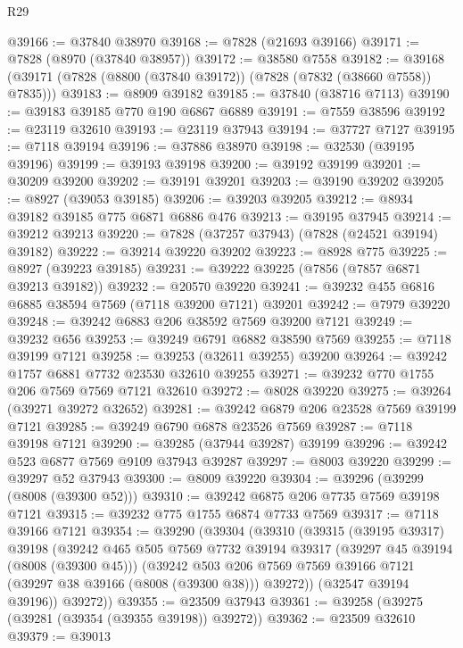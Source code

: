 \begin{lexlean}{R29}
\begin{coremodule}
@39166 := @37840 @38970
@39168 := @7828 (@21693 @39166)
@39171 := @7828 (@8970 (@37840 @38957))
@39172 := @38580 @7558
@39182 := @39168 (@39171 (@7828 (@8800 (@37840 @39172)) (@7828 (@7832 (@38660 @7558)) @7835)))
@39183 := @8909 @39182
@39185 := @37840 (@38716 @7113)
@39190 := @39183 @39185 @770 @190 @6867 @6889
@39191 := @7559 @38596
@39192 := @23119 @32610
@39193 := @23119 @37943
@39194 := @37727 @7127
@39195 := @7118 @39194
@39196 := @37886 @38970
@39198 := @32530 (@39195 @39196)
@39199 := @39193 @39198
@39200 := @39192 @39199
@39201 := @30209 @39200
@39202 := @39191 @39201
@39203 := @39190 @39202
@39205 := @8927 (@39053 @39185)
@39206 := @39203 @39205
@39212 := @8934 @39182 @39185 @775 @6871 @6886 @476
@39213 := @39195 @37945
@39214 := @39212 @39213
@39220 := @7828 (@37257 @37943) (@7828 (@24521 @39194) @39182)
@39222 := @39214 @39220 @39202
@39223 := @8928 @775
@39225 := @8927 (@39223 @39185)
@39231 := @39222 @39225 (@7856 (@7857 @6871 @39213 @39182))
@39232 := @20570 @39220
@39241 := @39232 @455 @6816 @6885 @38594 @7569 (@7118 @39200 @7121) @39201
@39242 := @7979 @39220
@39248 := @39242 @6883 @206 @38592 @7569 @39200 @7121
@39249 := @39232 @656
@39253 := @39249 @6791 @6882 @38590 @7569
@39255 := @7118 @39199 @7121
@39258 := @39253 (@32611 @39255) @39200
@39264 := @39242 @1757 @6881 @7732 @23530 @32610 @39255
@39271 := @39232 @770 @1755 @206 @7569 @7569 @7121 @32610
@39272 := @8028 @39220
@39275 := @39264 (@39271 @39272 @32652)
@39281 := @39242 @6879 @206 @23528 @7569 @39199 @7121
@39285 := @39249 @6790 @6878 @23526 @7569
@39287 := @7118 @39198 @7121
@39290 := @39285 (@37944 @39287) @39199
@39296 := @39242 @523 @6877 @7569 @9109 @37943 @39287
@39297 := @8003 @39220
@39299 := @39297 @52 @37943
@39300 := @8009 @39220
@39304 := @39296 (@39299 (@8008 (@39300 @52)))
@39310 := @39242 @6875 @206 @7735 @7569 @39198 @7121
@39315 := @39232 @775 @1755 @6874 @7733 @7569
@39317 := @7118 @39166 @7121
@39354 := @39290
    (@39304
      (@39310
        (@39315
          (@39195 @39317)
          @39198
          (@39242
            @465
            @505
            @7569
            @7732
            @39194
            @39317
            (@39297 @45 @39194 (@8008 (@39300 @45)))
            (@39242
              @503
              @206
              @7569
              @7569
              @39166
              @7121
              (@39297 @38 @39166 (@8008 (@39300 @38)))
              @39272))
          (@32547 @39194 @39196))
        @39272))
@39355 := @23509 @37943
@39361 := @39258 (@39275 (@39281 (@39354 (@39355 @39198)) @39272))
@39362 := @23509 @32610
@39379 := @39013

\end{coremodule}
\end{lexlean}
